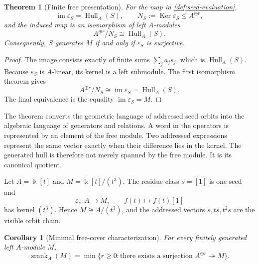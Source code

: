 \documentclass[11pt]{article}
\newtheorem{theorem}{Theorem}[section]
\newtheorem{corollary}[corollary]{Corollary}
\theoremstyle{definition}
\theoremstyle{remark}
\theoremstyle{definition}\newtheorem{example}[theorem]{Example}
\newcommand{\bbk}{\Bbbk}
\newcommand{\Hull}{\operatorname{Hull}}
\newcommand{\srank}{\operatorname{srank}}
\newcommand{\im}{\operatorname{im}}
\newcommand{\Ker}{\operatorname{Ker}}
\newcommand{\RecordID}[1]{\label{record:#1}}
\newcommand{\Depends}[1]{}
\newcommand{\Exports}[1]{}
\begin{document}
\begin{theorem}[Finite free presentation]
\label{thm:free-presentation}
For the map in \cref{def:seed-evaluation},
\[
\im\varepsilon_S=\Hull_A(S),
\qquad
N_S:=\Ker\varepsilon_S\leq A^{\oplus r},
\]
and the induced map is an isomorphism of left $A$-modules
\[
\boxed{A^{\oplus r}/N_S\cong\Hull_A(S).}
\]
Consequently, $S$ generates $M$ if and only if $\varepsilon_S$ is surjective.
\end{theorem}
\RecordID{PSC-I-T-FREE-PRESENTATION}
\Depends{PSC-I-D-SEED-EVALUATION and the first isomorphism theorem.}
\Exports{All later free seed presentations.}

\begin{proof}
The image consists exactly of finite sums $\sum_ja_js_j$, which is $\Hull_A(S)$.  Because $\varepsilon_S$ is $A$-linear, its kernel is a left submodule.  The first isomorphism theorem gives
\[
A^{\oplus r}/N_S\cong\im\varepsilon_S=\Hull_A(S).
\]
The final equivalence is the equality $\im\varepsilon_S=M$.
\end{proof}

\begin{interpretation}
The theorem converts the geometric language of addressed seed orbits into the algebraic language of generators and relations.  A word in the operators is represented by an element of the free module.  Two addressed expressions represent the same vector exactly when their difference lies in the kernel.  The generated hull is therefore not merely spanned by the free module.  It is its canonical quotient.
\end{interpretation}

\begin{microexample}[title={A cyclic nilpotent chain}]
Let \(A=\bbk[t]\) and \(M=\bbk[t]/(t^3)\).  The residue class \(s=[1]\) is one seed and
\[
\varepsilon_s:A\to M,
\qquad
f(t)\mapsto f(t)[1]
\]
has kernel \((t^3)\).  Hence \(M\cong A/(t^3)\), and the addressed vectors \(s,ts,t^2s\) are the visible orbit chain.
\end{microexample}


\begin{corollary}[Minimal free-cover characterization]
\label{cor:minimal-free-cover}
For every finitely generated left $A$-module $M$,
\[
\boxed{
\srank_A(M)=\min\{r\geq0:\text{there exists a surjection }A^{\oplus r}\twoheadrightarrow M\}.
}
\]
\end{corollary}
\RecordID{PSC-I-C-MINIMAL-FREE-COVER}
\Depends{PSC-I-T-FREE-PRESENTATION.}
\end{document}
